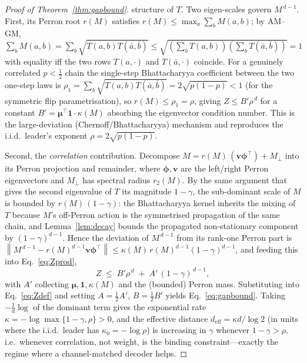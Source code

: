 \documentclass[reprint,aps,prxquantum,amsmath,amssymb,floatfix,nofootinbib,longbibliography]{revtex4-2}
\theoremstyle{definition}
\theoremstyle{remark}
\theoremstyle{plain}
\newcommand{\norm}[1]{\left\lVert #1 \right\rVert}
\begin{document}
\begin{proof}[Proof of Theorem~\ref{thm:gapbound}]
structure of $T$. Two eigen-scales govern $M^{\,d-1}$. First, its Perron root
$r(M)$ satisfies $r(M)\le\max_a\sum_bM(a,b)$; by AM--GM,
$\sum_bM(a,b)=\sum_b\sqrt{T(a,b)T(\bar a,\bar b)}\le
\sqrt{(\sum_bT(a,b))(\sum_bT(\bar a,\bar b))}=1$ with equality iff the two rows
$T(a,\cdot)$ and $T(\bar a,\cdot)$ coincide. For a genuinely correlated
$p<\tfrac12$ chain the single-step Bhattacharyya coefficient between the two
one-step laws is $\rho_1=\sum_b\sqrt{T(a,b)T(\bar a,\bar b)}=2\sqrt{p(1-p)}<1$
(for the symmetric flip parametrisation), so $r(M)\le\rho_1=\rho$, giving
$Z\le B'\rho^{\,d}$ for a constant $B'=\boldsymbol\mu^{\!\top}\mathbf 1\cdot\kappa(M)$
absorbing the eigenvector condition number. This is the large-deviation
(Chernoff/Bhattacharyya) mechanism and reproduces the i.i.d.\ leader's exponent
$\rho=2\sqrt{p(1-p)}$.

Second, the \emph{correlation} contribution. Decompose
$M=r(M)\,(\mathbf v\boldsymbol\phi^{\!\top})+M_\perp$ into its Perron projection
and remainder, where $\boldsymbol\phi,\mathbf v$ are the left/right Perron
eigenvectors and $M_\perp$ has spectral radius $r_2(M)$. By the same
argument that gives the second eigenvalue of $T$ its magnitude $1-\gamma$, the
sub-dominant scale of $M$ is bounded by $r(M)\,(1-\gamma)$: the Bhattacharyya
kernel inherits the mixing of $T$ because $M$'s off-Perron action is the
symmetrised propagation of the same chain, and Lemma~\ref{lem:decay} bounds the
propagated non-stationary component by $(1-\gamma)^{d-1}$. Hence the deviation
of $M^{\,d-1}$ from its rank-one Perron part is
$\norm{M^{\,d-1}-r(M)^{d-1}\mathbf v\boldsymbol\phi^{\!\top}}\le
\kappa(M)\,r(M)^{d-1}(1-\gamma)^{d-1}$, and feeding this into
Eq.~\eqref{eq:Zprod},
\begin{equation}
  Z\;\le\; B'\rho^{\,d}\;+\;A'\,(1-\gamma)^{\,d-1},
\end{equation}
with $A'$ collecting $\boldsymbol\mu,\mathbf 1,\kappa(M)$ and the (bounded)
Perron mass. Substituting into Eq.~\eqref{eq:Zdef} and setting
$A=\tfrac12A'$, $B=\tfrac12B'$ yields Eq.~\eqref{eq:gapbound}. Taking
$-\tfrac1d\log$ of the dominant term gives the exponential rate
$\kappa=-\log\max\{1-\gamma,\rho\}>0$, and the effective distance
$d_{\mathrm{eff}}=\kappa d/\log2$ (in units where the i.i.d.\ leader has
$\kappa_0=-\log\rho$) is increasing in $\gamma$ whenever $1-\gamma>\rho$, i.e.\
whenever correlation, not weight, is the binding constraint---exactly the
regime where a channel-matched decoder helps.
\end{proof}
\end{document}
